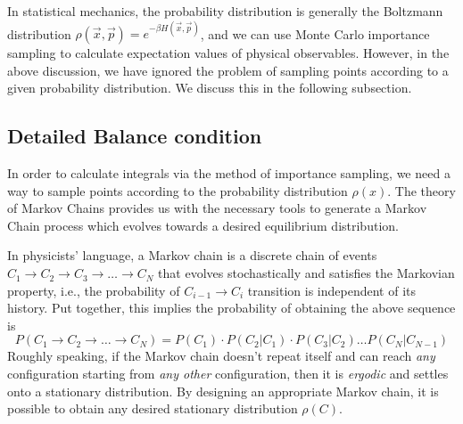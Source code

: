 \documentclass[../thesis_main.tex]{subfiles}
\begin{document}
In statistical mechanics, the probability distribution is generally the Boltzmann distribution $\rho(\vec{x}, \vec{p}) = e^{-\beta H (\vec{x},\vec{p})}$, and we can use Monte Carlo importance sampling to calculate expectation values of physical observables. However, in the above discussion, we have ignored the problem of sampling points according to a given probability distribution. We discuss this in the following subsection.

\subsection{Detailed Balance condition}
In order to calculate integrals via the method of importance sampling, we need a way to sample points according to the probability distribution $\rho(x)$. The theory of Markov Chains provides us with the necessary tools to generate a Markov Chain process which evolves towards a desired equilibrium distribution.

In physicists' language, a Markov chain is a discrete chain of events $C_1 \to C_2 \to C_3 \to \ldots \to C_N$ that evolves stochastically and satisfies the Markovian property, i.e., the probability of $C_{i-1} \to C_i$ transition is independent of its history. Put together, this implies the probability of obtaining the above sequence is
\begin{equation}
    P(C_1 \to C_2 \to\ldots \to C_N) = P(C_1)\cdot P(C_2 | C_1) \cdot P(C_3 | C_2) \ldots P(C_N | C_{N-1})
\end{equation}
Roughly speaking, if the Markov chain doesn't repeat itself and can reach \textit{any}  configuration starting from \textit{any other}  configuration, then it is \textit{ergodic} and settles onto a stationary distribution. By designing an appropriate Markov chain, it is possible to obtain any desired stationary distribution $\rho(C)$.
\end{document}
